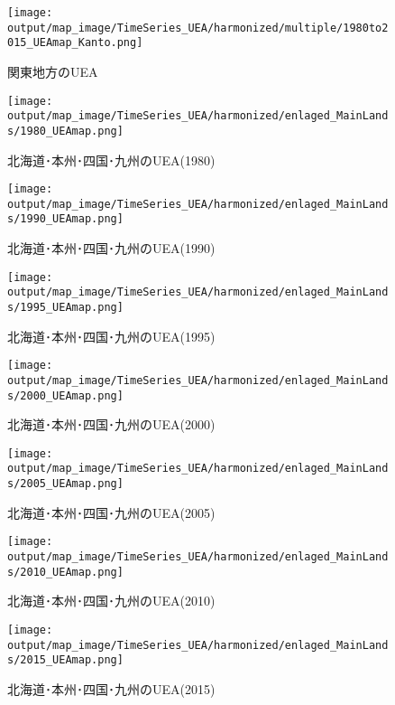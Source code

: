 \documentclass{ltjsarticle}
\begin{document}
\begin{figure}[pbth]
  \centering
  \texttt{[image: output/map\_image/TimeSeries\_UEA/harmonized/multiple/1980to2015\_UEAmap\_Kanto.png]}
  \caption{\label{ham:tsUEA:kan}関東地方のUEA}
\end{figure}

\begin{figure}[pbth]
  \centering
  \texttt{[image: output/map\_image/TimeSeries\_UEA/harmonized/enlaged\_MainLands/1980\_UEAmap.png]}
  \caption{\label{ham:1980UEA:enl}北海道･本州･四国･九州のUEA(1980)}
\end{figure}
\begin{figure}[pbth]
  \centering
  \texttt{[image: output/map\_image/TimeSeries\_UEA/harmonized/enlaged\_MainLands/1990\_UEAmap.png]}
  \caption{\label{ham:1990UEA:enl}北海道･本州･四国･九州のUEA(1990)}
\end{figure}
\begin{figure}[pbth]
  \centering
  \texttt{[image: output/map\_image/TimeSeries\_UEA/harmonized/enlaged\_MainLands/1995\_UEAmap.png]}
  \caption{\label{ham:1995UEA:enl}北海道･本州･四国･九州のUEA(1995)}
\end{figure}
\begin{figure}[pbth]
  \centering
  \texttt{[image: output/map\_image/TimeSeries\_UEA/harmonized/enlaged\_MainLands/2000\_UEAmap.png]}
  \caption{\label{ham:2000UEA:enl}北海道･本州･四国･九州のUEA(2000)}
\end{figure}
\begin{figure}[pbth]
  \centering
  \texttt{[image: output/map\_image/TimeSeries\_UEA/harmonized/enlaged\_MainLands/2005\_UEAmap.png]}
  \caption{\label{ham:2005UEA:enl}北海道･本州･四国･九州のUEA(2005)}
\end{figure}
\begin{figure}[pbth]
  \centering
  \texttt{[image: output/map\_image/TimeSeries\_UEA/harmonized/enlaged\_MainLands/2010\_UEAmap.png]}
  \caption{\label{ham:2010UEA:enl}北海道･本州･四国･九州のUEA(2010)}
\end{figure}
\begin{figure}[pbth]
  \centering
  \texttt{[image: output/map\_image/TimeSeries\_UEA/harmonized/enlaged\_MainLands/2015\_UEAmap.png]}
  \caption{\label{ham:2015UEA:enl}北海道･本州･四国･九州のUEA(2015)}
\end{figure}
\end{document}
